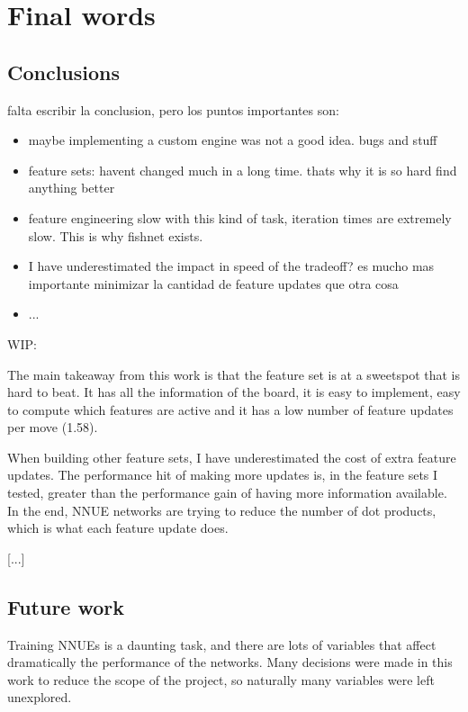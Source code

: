 \section{Final words}
\subsection{Conclusions}



falta escribir la conclusion, pero los puntos importantes son:

\begin{itemize}
\item maybe implementing a custom engine was not a good idea. bugs and stuff
\item feature sets: havent changed much in a long time. thats why it is so hard find anything better
\item feature engineering slow with this kind of task, iteration times are extremely slow. This is why fishnet exists.
\item I have underestimated the impact in speed of the tradeoff? es mucho mas importante minimizar la cantidad de feature updates que otra cosa
\item ...
\end{itemize}


WIP:

The main takeaway from this work is that the  feature set is at a sweetspot that is hard to beat. It has all the information of the board, it is easy to implement, easy to compute which features are active and it has a low number of feature updates per move (1.58).

When building other feature sets, I have underestimated the cost of extra feature updates. The performance hit of making more updates is, in the feature sets I tested, greater than the performance gain of having more information available. In the end, NNUE networks are trying to reduce the number of dot products, which is what each feature update does.

[...]

\subsection{Future work}

Training NNUEs is a daunting task, and there are lots of variables that affect dramatically the performance of the networks. Many decisions were made in this work to reduce the scope of the project, so naturally many variables were left unexplored.

